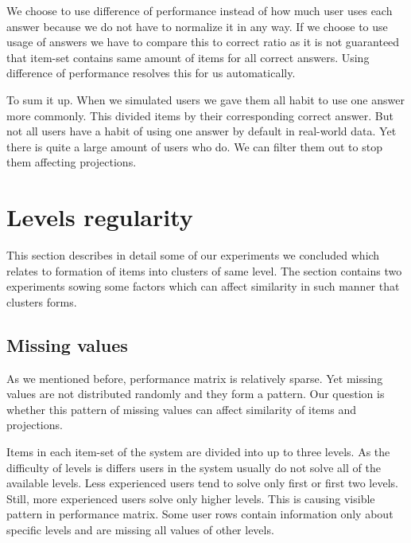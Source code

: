 \documentclass[
  digital, %
  table,   %
  nolof,     %
  nolot,     %
  nocover,
  color
]{fithesis3}
\begin{document}
We choose to use difference of performance instead of how much user uses each answer because we do not have to normalize it in any way. If we choose to use usage of answers we have to compare this to correct ratio as it is not guaranteed that item-set contains same amount of items for all correct answers. Using difference of performance resolves this for us automatically.


To sum it up. When we simulated users we gave them all habit to use one answer more commonly. This divided items by their corresponding correct answer. But not all users have a habit of using one answer by default in real-world data. Yet there is quite a large amount of users who do. We can filter them out to stop them affecting projections.


\section{Levels regularity}\label{evaulation-levels-regularity}

This section describes in detail some of our experiments we concluded which relates to formation of items into clusters of same level. The section contains two experiments sowing some factors which can affect similarity in such manner that clusters forms.


\subsection{Missing values}\label{missing-values}


As we mentioned before, performance matrix is relatively sparse. Yet missing values are not distributed randomly and they form a pattern. Our question is whether this pattern of missing values can affect similarity of items and projections.


Items in each item-set of the system are divided into up to three levels. As the difficulty of levels is differs users in the system usually do not solve all of the available levels. Less experienced users tend to solve only first or first two levels. Still, more experienced users solve only higher levels. This is causing visible pattern in performance matrix. Some user rows contain information only about specific levels and are missing all values of other levels.
\end{document}
